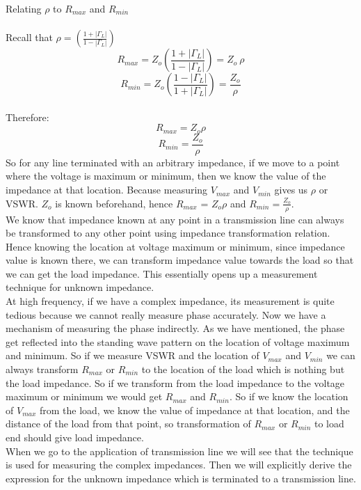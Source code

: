 	Relating $\rho$ to $R_{max}$ and  $R_{min}$\\\\
	Recall that $\rho =  (\frac{1 + |\Gamma_L|}{1 - |\Gamma_L|})$
	\begin{equation*}
	R_{max}  = Z_o  (\frac{1 + |\Gamma_L|}{1 - |\Gamma_L|}) = Z_o    \  \rho
	\end{equation*}
	\begin{equation*}
	R_{min}  = Z_o  (\frac{1 - |\Gamma_L|}{1 + |\Gamma_L|}) =\frac{Z_o}{\rho}
	\end{equation*}
	\\Therefore:
	\begin{equation}
	R_{max} = Z_o \rho
	\end{equation}
	\begin{equation}
	R_{min} = \frac{Z_o}{\rho}
	\end{equation}
	So for any line terminated with an arbitrary impedance, if we move to a point where the voltage is maximum or minimum, then we know the value of the impedance at that location. Because measuring $V_{max}$ and $V_{min}$ gives us $\rho$ or VSWR. $Z_o$ is known beforehand, hence $R_{max}$ = $Z_o \rho$ and $R_{min} = \frac{Z_o}{\rho}$. \\
	We know that impedance known at any point in a transmission line can always be transformed to any other point using impedance transformation relation. Hence knowing the location at voltage maximum or minimum, since impedance value is known there, we can transform impedance value towards the load so that we can get the load impedance. This essentially opens up a measurement technique for unknown impedance. \\
	At high frequency, if we have a complex impedance, its measurement is quite tedious because we cannot really measure phase accurately. Now we have a mechanism of measuring the phase indirectly. As we have mentioned, the phase get reflected into the standing wave pattern on the location of voltage maximum and minimum. So if we measure VSWR and the location of $V_{max}$ and $V_{min}$ we can always transform $R_{max}$ or $R_{min}$ to the location of the load which is nothing but the load impedance. So if we transform from the load impedance to the voltage maximum or minimum we would get $R_{max}$ and $R_{min}$. So if we know the location of $V_{max}$ from the load, we know the value of impedance at that location, and the distance of the load from that point, so transformation of $R_{max}$ or $R_{min}$ to load end should give load impedance.\\
	When we go to the application of transmission line we will see that the technique is used for measuring the complex impedances. Then we will explicitly derive the expression for the unknown impedance which is terminated to a transmission line. 